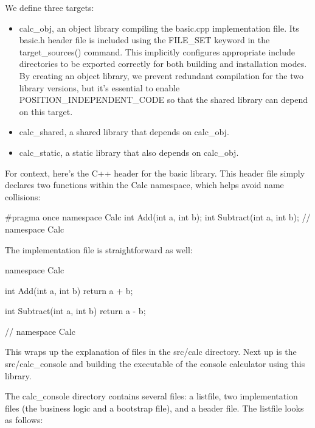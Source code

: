We define three targets:

\begin{itemize}
\item
calc\_obj, an object library compiling the basic.cpp implementation file. Its basic.h header file is included using the FILE\_SET keyword in the target\_sources() command. This implicitly configures appropriate include directories to be exported correctly for both building and installation modes. By creating an object library, we prevent redundant compilation for the two library versions, but it’s essential to enable POSITION\_INDEPENDENT\_CODE so that the shared library can depend on this target.

\item
calc\_shared, a shared library that depends on calc\_obj.

\item
calc\_static, a static library that also depends on calc\_obj.
\end{itemize}

For context, here’s the C++ header for the basic library. This header file simply declares two functions within the Calc namespace, which helps avoid name collisions:


\begin{cpp}
#pragma once
namespace Calc {
    int Add(int a, int b);
    int Subtract(int a, int b);
} // namespace Calc
\end{cpp}

The implementation file is straightforward as well:


\begin{cpp}
namespace Calc {
    int Add(int a, int b) {
        return a + b;
    }

    int Subtract(int a, int b) {
        return a - b;
    }
} // namespace Calc
\end{cpp}

This wraps up the explanation of files in the src/calc directory. Next up is the src/calc\_console and building the executable of the console calculator using this library.


The calc\_console directory contains several files: a listfile, two implementation files (the business logic and a bootstrap file), and a header file. The listfile looks as follows:

